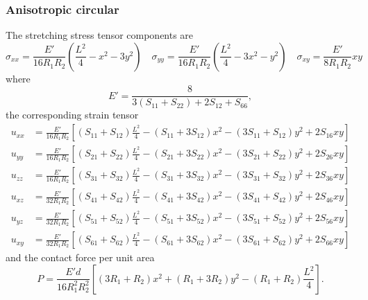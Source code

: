 \documentclass[11pt,a4paper]{article}
\begin{document}
\subsubsection{Anisotropic circular}
The stretching stress tensor components are 
\begin{equation}
\sigma_{xx} =  \frac{E'}{16 R_1 R_2}\left( \frac{L^2}{4} - x^2 - 3 y^2 \right) \quad 
\sigma_{yy} =  \frac{E'}{16 R_1 R_2}\left(\frac{L^2}{4} - 3 x^2 - y^2\right) \quad
\sigma_{xy} = \frac{E'}{8 R_1 R_2}x y
\end{equation}
where 
\begin{equation}
E' = \frac{8}{3(S_{11}+S_{22})+2 S_{12}+S_{66}},
\end{equation}
the corresponding strain tensor 
\begin{align}
u_{xx} &= \frac{E'}{16 R_1 R_2} \left[ (S_{11}+S_{12})\frac{L^2}{4} - (S_{11} + 3 S_{12}) x^2  -(3 S_{11} + S_{12}) y^2 + 2 S_{16} xy \right] \\
u_{yy} &= \frac{E'}{16 R_1 R_2} \left[ (S_{21}+S_{22})\frac{L^2}{4} - (S_{21} + 3 S_{22}) x^2  -(3 S_{21} + S_{22}) y^2 + 2 S_{26} xy \right] \\
u_{zz} &= \frac{E'}{16 R_1 R_2} \left[ (S_{31}+S_{32})\frac{L^2}{4} - (S_{31} + 3 S_{32}) x^2  -(3 S_{31} + S_{32}) y^2 + 2 S_{36} xy \right] \\
u_{xz} &= \frac{E'}{32 R_1 R_2} \left[ (S_{41}+S_{42})\frac{L^2}{4} - (S_{41} + 3 S_{42}) x^2  -(3 S_{41} + S_{42}) y^2 + 2 S_{46} xy \right] \\
u_{yz} &= \frac{E'}{32 R_1 R_2} \left[ (S_{51}+S_{52})\frac{L^2}{4} - (S_{51} + 3 S_{52}) x^2  -(3 S_{51} + S_{52}) y^2 + 2 S_{56} xy \right] \\
u_{xy} &= \frac{E'}{32 R_1 R_2} \left[ (S_{61}+S_{62})\frac{L^2}{4} - (S_{61} + 3 S_{62}) x^2  -(3 S_{61} + S_{62}) y^2 + 2 S_{66} xy \right]
\end{align}
and the contact force per unit area
\begin{equation}
P = \frac{E' d}{16 R_1^2 R_2^2} \left[ 
\left(3 R_1 + R_2 \right) x^2
+ \left(R_1 + 3 R_2 \right) y^2
- \left(R_1 + R_2 \right)\frac{L^2}{4}
\right].
\end{equation}
\end{document}
